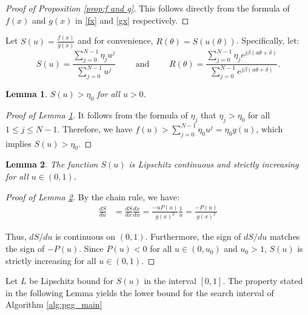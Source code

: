\documentclass{article}
\newtheorem{lemma}{Lemma}
\begin{document}
\begin{proof}[Proof of Proposition \ref{prop:f and g}]
This follows directly from the formula of $f(x)$ and $g(x)$ in \eqref{fx}  and \eqref{gx} respectively. 
\end{proof}
Let $S(u) = \frac{f(x)}{g(x)}$ and for convenience, $R(\theta) = S(u(\theta))$. Specifically, let:
\[
S(u) = \frac{\sum_{j=0}^{N-1} \eta_j u^j}{\sum_{j=0}^{N-1} u^j} \qquad \text{ and } \qquad R(\theta) = \frac{\sum_{j=0}^{N-1} \eta_j e^{j\beta(a\theta+\delta)}}{\sum_{j=0}^{N-1} e^{j\beta(a\theta+\delta)}}.
\]
\begin{lemma} \label{obs_eta0}
$S(u) > \eta_0$ for all $u > 0$.
\end{lemma}
\begin{proof}[Proof of Lemma \ref{obs_eta0}]
It follows from the formula of $\eta_j$ that $\eta_j > \eta_0$ for all $1 \le j \le N-1$. Therefore, we have $f(u) > \sum_{j=0}^{N-1} \eta_0 u^j = \eta_0 g(u)$, which implies $S(u) > \eta_0$.
\end{proof}
\begin{lemma} \label{obs_lipschitz}
The function $S(u)$ is Lipschitz continuous and strictly increasing for all $u \in (0, 1)$.
\end{lemma}
\begin{proof}[Proof of Lemma \ref{obs_lipschitz}]
By the chain rule, we have:
\begin{align*}
\frac{dS}{du} &= \frac{dS}{dx} \frac{dx}{du} = \frac{-uP(u)}{g(x)^2} \frac{1}{u} = \frac{-P(u)}{g(x)^2}
\end{align*}

Thus, $dS/du$ is continuous on $(0, 1)$. Furthermore, the sign of $dS/du$ matches the sign of $-P(u)$. Since $P(u) < 0$ for all $u \in (0, u_0)$ and $u_0 > 1$, $S(u)$ is strictly increasing for all $u \in (0, 1)$.
\end{proof}

Let $L$ be Lipschitz bound for $S(u)$ in the interval $[0, 1]$.  The property stated in the following Lemma yields the lower bound for the search interval of Algorithm \ref{alg:pgg_main}
\end{document}

